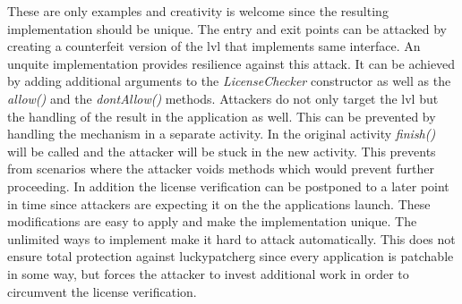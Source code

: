 These are only examples and creativity is welcome since the resulting implementation should be unique. \cite{developersSecuring}
\newline
The entry and exit points can be attacked by creating a counterfeit version of the \gls{lvl} that implements same interface.
An unquite implementation provides resilience against this attack.
It can be achieved by adding additional arguments to the \textit{LicenseChecker} constructor as well as the \textit{allow()} and the \textit{dontAllow()} methods.
\newline
Attackers do not only target the \gls{lvl} but the handling of the result in the application as well.
This can be prevented by handling the mechanism in a separate activity.
In the original activity \textit{finish()} will be called and the attacker will be stuck in the new activity.
This prevents from scenarios where the attacker voids methods which would prevent further proceeding.
In addition the license verification can be postponed to a later point in time since attackers are expecting it on the the applications launch. \cite{developersSecuring}
\newline
These modifications are easy to apply and make the implementation unique.
The unlimited ways to implement make it hard to attack automatically.
This does not ensure total protection against \gls{luckypatcherg} since every application is patchable in some way, but forces the attacker to invest additional work in order to circumvent the license verification.
